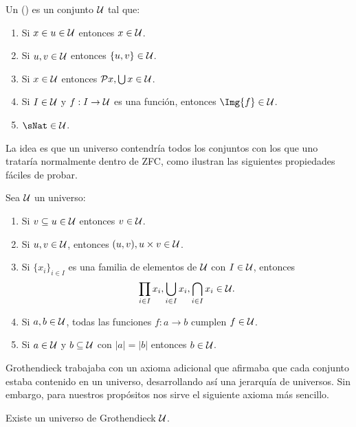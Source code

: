 \begin{definition}
  Un  () es un conjunto $\mathcal{U}$
  tal que:
  \begin{enumerate}
  \item Si $x\in u\in\mathcal{U}$ entonces $x\in\mathcal{U}$.
  \item Si $u,v\in\mathcal{U}$ entonces $\{u,v\}\in\mathcal{U}$.
  \item Si $x\in\mathcal{U}$ entonces $\mathcal{P}{x},\bigcup{x}\in\mathcal{U}$.
  \item Si $I\in\mathcal{U}$ y $f:I\to\mathcal{U}$ es una función, entonces
    $\Img{f}\in\UNIVERSE$.
  \item $\sNat\in\UNIVERSE$.
  \end{enumerate}
\end{definition}

La idea es que un universo contendría todos los conjuntos con los que uno
trataría normalmente dentro de ZFC, como ilustran las siguientes propiedades
fáciles de probar.

\begin{proposition}
  Sea $\mathcal{U}$ un universo:
  \begin{enumerate}
  \item Si $v\subseteq u\in\mathcal{U}$ entonces $v\in\mathcal{U}$.
    \item Si $u,v\in\mathcal{U}$, entonces $(u,v),u\times v\in\mathcal{U}$.
    \item Si $\{x_i\}_{i\in I}$ es una familia de elementos de $\mathcal{U}$ con
      $I\in\mathcal{U}$, entonces
      \[
        \prod_{i\in I}x_i,\bigcup_{i\in I}x_i,\bigcap_{i\in I}x_i\in\mathcal{U}.
      \]
    \item Si $a,b\in\mathcal{U}$, todas las funciones $f:a\to b$ cumplen
      $f\in\mathcal{U}$.
    \item Si $a\in\mathcal{U}$ y $b\subseteq\mathcal{U}$ con $|a|=|b|$ entonces
      $b\in\mathcal{U}$.
  \end{enumerate}
\end{proposition}

Grothendieck trabajaba con un axioma adicional que afirmaba que cada conjunto
estaba contenido en un universo, desarrollando así una jerarquía de universos.
Sin embargo, para nuestros propósitos nos sirve el siguiente axioma más
sencillo.

\begin{axiom}
  Existe un universo de Grothendieck $\mathcal{U}$.
\end{axiom}

